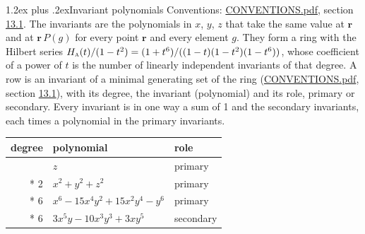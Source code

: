 \documentclass[10pt,a4paper]{article}
\makeatletter
\renewcommand\section{\@startsection{section}{1}{\z@}{-3ex plus -1ex minus -.2ex}%
  {1.2ex plus .2ex}{\normalfont\large\sffamily\bfseries\color{parttitle}}}
\numberwithin{equation}{section}
\newcommand{\irr}[1]{\text{\normalfont\scshape #1}}
\newcommand{\pointr}{\mathbf{r}}
\makeatother
\begin{document}
\section{Invariant polynomials}\label{s:invariant_polynomials}
Conventions: \href{../../CONVENTIONS.pdf}{CONVENTIONS.pdf}, section \href{../../CONVENTIONS.pdf\#conv.13.1}{13.1}.
The invariants are the polynomials in $x$, $y$, $z$ that take the same value at $\pointr$ and at $\pointr\,P(g)$ for every point $\pointr$ and every element $g$. They form a ring with the Hilbert series $H_{\irr{a}}(t)/(1-t^{2}) = (1 + t^{6})/((1-t)(1-t^{2})(1-t^{6}))$, whose coefficient of a power of $t$ is the number of linearly independent invariants of that degree. \label{n:head.degree}\label{n:head.role}A row is an invariant of a minimal generating set of the ring (\href{../../CONVENTIONS.pdf}{CONVENTIONS.pdf}, section \href{../../CONVENTIONS.pdf\#conv.13.1}{13.1}), with its degree, the invariant (polynomial) and its role, primary or secondary. Every invariant is in one way a sum of 1 and the secondary invariants, each times a polynomial in the primary invariants.
{\small\begin{longtable}{@{}rll@{}}\toprule
degree & polynomial & role\\\midrule\endhead
\bottomrule\endfoot\endlastfoot
1 & $z$ & primary\\*
2 & $x^{2} + y^{2} + z^{2}$ & primary\\*
6 & $x^{6} - 15x^{4}y^{2} + 15x^{2}y^{4} - y^{6}$ & primary\\*
6 & $3x^{5}y - 10x^{3}y^{3} + 3xy^{5}$ & secondary\\
\bottomrule\end{longtable}}
\end{document}
